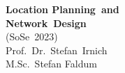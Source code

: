 \begin{minipage}[t]{5cm}
\scriptsize
{\bf Location Planning~and\\ Network~Design}\\
(SoSe~2023)\\
\tiny
Prof.~Dr.~Stefan~Irnich\\
M.Sc.~Stefan Faldum

\end{minipage}

